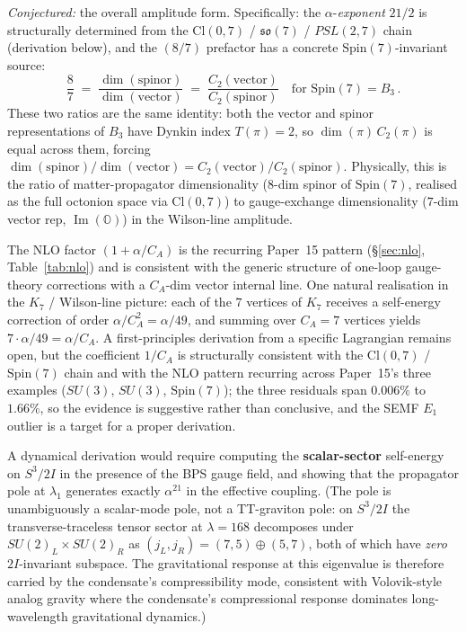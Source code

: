 \documentclass[11pt]{article}
\newcommand{\CA}{C_A}
\begin{document}
\emph{Conjectured:} the overall amplitude form.  Specifically:
the $\alpha$-\emph{exponent} $21/2$ is structurally determined
from the $\mathrm{Cl}(0,7)$ / $\mathfrak{so}(7)$ / $PSL(2,7)$
chain (derivation below), and the $(8/7)$ prefactor has a concrete
$\mathrm{Spin}(7)$-invariant source:
\begin{equation}
  \frac{8}{7}
  \;=\; \frac{\dim(\text{spinor})}{\dim(\text{vector})}
  \;=\; \frac{C_2(\text{vector})}{C_2(\text{spinor})}
  \quad\text{for }\mathrm{Spin}(7) = B_3\,.
\end{equation}
These two ratios are the same identity: both the vector and spinor
representations of $B_3$ have Dynkin index $T(\pi) = 2$, so
$\dim(\pi)\,C_2(\pi)$ is equal across them, forcing
$\dim(\text{spinor})/\dim(\text{vector}) = C_2(\text{vector})/C_2(\text{spinor})$.
Physically, this is the ratio of matter-propagator dimensionality
($8$-dim spinor of $\mathrm{Spin}(7)$, realised as the full octonion
space via $\mathrm{Cl}(0, 7)$) to gauge-exchange dimensionality
($7$-dim vector rep, $\operatorname{Im}(\mathbb{O})$) in the
Wilson-line amplitude.

The NLO factor $(1 + \alpha/\CA)$ is the recurring Paper~15
pattern (\S\ref{sec:nlo}, Table~\ref{tab:nlo}) and is consistent
with the generic structure of one-loop gauge-theory corrections
with a $\CA$-dim vector internal line.  One natural realisation
in the $K_7$ / Wilson-line picture: each of the $7$ vertices of
$K_7$ receives a self-energy correction of order $\alpha/\CA^2 =
\alpha/49$, and summing over $\CA = 7$ vertices yields
$7 \cdot \alpha/49 = \alpha/\CA$.  A first-principles derivation
from a specific Lagrangian remains open, but the coefficient
$1/\CA$ is structurally consistent with the $\mathrm{Cl}(0, 7)$
/ $\mathrm{Spin}(7)$ chain and with the NLO pattern recurring
across Paper~15's three examples ($SU(3)$, $SU(3)$,
$\mathrm{Spin}(7)$); the three residuals span $0.006\%$ to
$1.66\%$, so the evidence is suggestive rather than conclusive,
and the SEMF $E_1$ outlier is a target for a proper derivation.

A dynamical derivation would require computing the
\textbf{scalar-sector} self-energy on $S^3/2I$ in the presence
of the BPS gauge field, and showing that the propagator pole at
$\lambda_1$ generates exactly $\alpha^{21}$ in the effective
coupling.  (The pole is unambiguously a scalar-mode pole, not a
TT-graviton pole: on $S^3/2I$ the transverse-traceless tensor
sector at $\lambda = 168$ decomposes under
$SU(2)_L \times SU(2)_R$ as $(j_L, j_R) = (7,5) \oplus (5,7)$,
both of which have \emph{zero} $2I$-invariant subspace.  The
gravitational response at this eigenvalue is therefore carried
by the condensate's compressibility mode, consistent with
Volovik-style analog gravity where the condensate's compressional
response dominates long-wavelength gravitational dynamics.)
\end{document}
